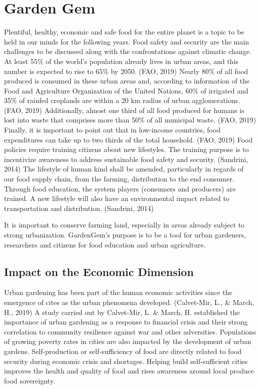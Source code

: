 \chapter{Garden Gem} %

\label{Chapter:OurContribution}

Plentiful, healthy, economic and safe food for the entire planet is a topic to be held in our minds for the following years. Food safety and security are the main challenges to be discussed along with the confrontations against climatic change. At least 55\% of the world’s population already lives in urban areas, and this number is expected to rise to 65\% by 2050. (FAO, 2019) Nearly 80\% of all food produced is consumed in these urban areas and, according to information of the Food and Agriculture Organization of the United Nations, 60\% of irrigated and 35\% of rainfed croplands are within a 20 km radius of urban agglomerations. (FAO, 2019) Additionally, almost one third of all food produced for humans is lost into waste that comprises more than 50\% of all municipal waste. (FAO, 2019) Finally, it is important to point out that in low-income countries, food expenditures can take up to two thirds of the total household. (FAO, 2019) Food policies require training citizens about new lifestyles. The training purpose is to incentivize awareness to address sustainable food safety and security. (Sandrini, 2014)
The lifestyle of human kind shall be amended, particularly in regards of our food supply chain, from the farming, distribution to the end consumer. Through food education, the system players (consumers and producers) are trained. A new lifestyle will also have an environmental impact related to transportation and distribution. (Sandrini, 2014)

It is important to conserve farming land, especially in areas already subject to strong urbanization. GardenGem’s purpose is to be a tool for urban gardeners, researchers and citizens for food education and urban agriculture.

\section{Impact on the Economic Dimension}

Urban gardening has been part of the human economic activities since the emergence of cites as the urban phenomena developed. (Calvet-Mir, L., \& March, H., 2019) A study carried out by Calvet-Mir, L. \& March, H. established the importance of urban gardening as a response to financial crisis and their strong correlation to community resilience against war and other adversities. Populations of growing poverty rates in cities are also impacted by the development of urban gardens. Self-production or self-sufficiency of food are directly related to food security during economic crisis and shortages. Helping build self-sufficient cities improves the health and quality of food and rises awareness around local produce food sovereignty.

